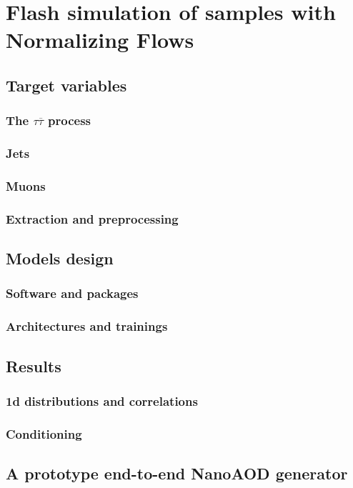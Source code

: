 \chapter{Flash simulation of samples with Normalizing Flows}\label{ch:fs} %

\section{Target variables}

\subsection{The $\tau \overline{\tau}$ process}

\subsection{Jets}

\subsection{Muons}

\subsection{Extraction and preprocessing}

\section{Models design}

\subsection{Software and packages}

\subsection{Architectures and trainings}

\section{Results}

\subsection{1d distributions and correlations}

\subsection{Conditioning}

\section{A prototype end-to-end NanoAOD generator}

